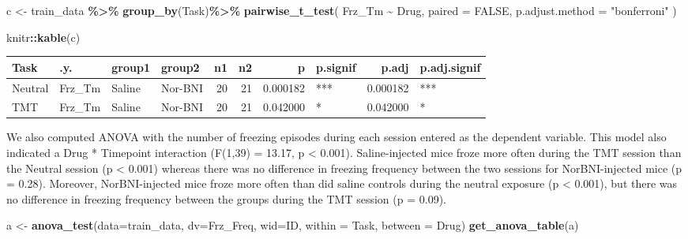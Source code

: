 \documentclass[
]{book}
\newenvironment{Shaded}{\begin{snugshade}}{\end{snugshade}}
\newcommand{\AttributeTok}[1]{\textcolor[rgb]{0.13,0.29,0.53}{#1}}
\newcommand{\ConstantTok}[1]{\textcolor[rgb]{0.56,0.35,0.01}{#1}}
\newcommand{\FunctionTok}[1]{\textcolor[rgb]{0.13,0.29,0.53}{\textbf{#1}}}
\newcommand{\NormalTok}[1]{#1}
\newcommand{\OtherTok}[1]{\textcolor[rgb]{0.56,0.35,0.01}{#1}}
\newcommand{\SpecialCharTok}[1]{\textcolor[rgb]{0.81,0.36,0.00}{\textbf{#1}}}
\newcommand{\StringTok}[1]{\textcolor[rgb]{0.31,0.60,0.02}{#1}}
\begin{document}
\begin{Shaded}
\begin{Highlighting}[]
\NormalTok{c }\OtherTok{\textless{}{-}}\NormalTok{ train\_data }\SpecialCharTok{\%\textgreater{}\%}
  \FunctionTok{group\_by}\NormalTok{(Task)}\SpecialCharTok{\%\textgreater{}\%}
  \FunctionTok{pairwise\_t\_test}\NormalTok{(}
\NormalTok{  Frz\_Tm }\SpecialCharTok{\textasciitilde{}}\NormalTok{ Drug, }\AttributeTok{paired =} \ConstantTok{FALSE}\NormalTok{,}
  \AttributeTok{p.adjust.method =} \StringTok{"bonferroni"}
\NormalTok{  )}

\NormalTok{knitr}\SpecialCharTok{::}\FunctionTok{kable}\NormalTok{(c)}
\end{Highlighting}
\end{Shaded}

\begin{tabular}{l|l|l|l|r|r|r|l|r|l}
\hline
Task & .y. & group1 & group2 & n1 & n2 & p & p.signif & p.adj & p.adj.signif\\
\hline
Neutral & Frz\_Tm & Saline & Nor-BNI & 20 & 21 & 0.000182 & *** & 0.000182 & ***\\
\hline
TMT & Frz\_Tm & Saline & Nor-BNI & 20 & 21 & 0.042000 & * & 0.042000 & *\\
\hline
\end{tabular}

We also computed ANOVA with the number of freezing episodes during each session entered as the dependent variable. This model also indicated a Drug * Timepoint interaction (F(1,39) = 13.17, p \textless{} 0.001). Saline-injected mice froze more often during the TMT session than the Neutral session (p \textless{} 0.001) whereas there was no difference in freezing frequency between the two sessions for NorBNI-injected mice (p = 0.28). Moreover, NorBNI-injected mice froze more often than did saline controls during the neutral exposure (p \textless{} 0.001), but there was no difference in freezing frequency between the groups during the TMT session (p = 0.09).

\begin{Shaded}
\begin{Highlighting}[]
\NormalTok{a }\OtherTok{\textless{}{-}} \FunctionTok{anova\_test}\NormalTok{(}\AttributeTok{data=}\NormalTok{train\_data, }\AttributeTok{dv=}\NormalTok{Frz\_Freq, }\AttributeTok{wid=}\NormalTok{ID, }\AttributeTok{within =}\NormalTok{ Task, }\AttributeTok{between =}\NormalTok{ Drug)}
\FunctionTok{get\_anova\_table}\NormalTok{(a)}
\end{Highlighting}
\end{Shaded}
\end{document}
